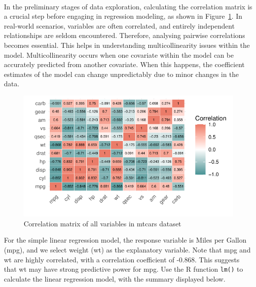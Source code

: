 \documentclass{article}\usepackage[]{graphicx}\usepackage[]{xcolor}
\makeatletter
\def\maxwidth{ %
  \ifdim\Gin@nat@width>\linewidth
    \linewidth
  \else
    \Gin@nat@width
  \fi
}
\newenvironment{knitrout}{}{} %
\numberwithin{equation}{section}
\makeatother
\begin{document}
\noindent
\\In the preliminary stages of data exploration, calculating the correlation matrix is a crucial step before engaging in regression modeling, as shown in Figure~\ref{fig:cor-matrix-mtcars2}. In real-world scenarios, variables are often correlated, and entirely independent relationships are seldom encountered. Therefore, analysing pairwise correlations becomes essential. This helps in understanding multicollinearity issues within the model. Multicollinearity occurs when one covariate within the model can be accurately predicted from another covariate. When this happens, the coefficient estimates of the model can change unpredictably due to minor changes in the data.\\



\begin{knitrout}\scriptsize
{}\color{fgcolor}\begin{figure}[H]

{\centering \includegraphics[width=\maxwidth]{figure/beamer-cor-matrix-mtcars2-1} 

}

\caption[Correlation matrix of all variables in mtcars dataset]{Correlation matrix of all variables in mtcars dataset}\label{fig:cor-matrix-mtcars2}
\end{figure}

\end{knitrout}

\noindent
For the simple linear regression model, the response variable is Miles per Gallon (mpg), and we select weight (wt) as the explanatory variable. Note that mpg and wt are highly correlated, with a correlation coefficient of -0.868. This suggests that wt may have strong predictive power for mpg. Use the R function \texttt{lm()} to calculate the linear regression model, with the summary displayed below.\\
\end{document}
